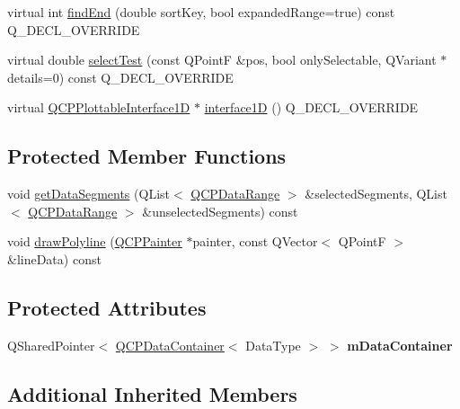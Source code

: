 \begin{DoxyCompactItemize}
\item 
virtual int \hyperlink{classQCPAbstractPlottable1D_a6e3ba20c9160d7361e58070390d10b1a}{find\+End} (double sort\+Key, bool expanded\+Range=true) const Q\+\_\+\+D\+E\+C\+L\+\_\+\+O\+V\+E\+R\+R\+I\+DE
\item 
virtual double \hyperlink{classQCPAbstractPlottable1D_a4611b43bcb6441b2154eb4f4e0a33db2}{select\+Test} (const Q\+PointF \&pos, bool only\+Selectable, Q\+Variant $\ast$details=0) const Q\+\_\+\+D\+E\+C\+L\+\_\+\+O\+V\+E\+R\+R\+I\+DE
\item 
virtual \hyperlink{classQCPPlottableInterface1D}{Q\+C\+P\+Plottable\+Interface1D} $\ast$ \hyperlink{classQCPAbstractPlottable1D_ac58fb47bfe330f6931ed8e64326387d7}{interface1D} () Q\+\_\+\+D\+E\+C\+L\+\_\+\+O\+V\+E\+R\+R\+I\+DE
\end{DoxyCompactItemize}
\subsection*{Protected Member Functions}
\begin{DoxyCompactItemize}
\item 
void \hyperlink{classQCPAbstractPlottable1D_ae890e62ce403c54f575c73b9529f1af8}{get\+Data\+Segments} (Q\+List$<$ \hyperlink{classQCPDataRange}{Q\+C\+P\+Data\+Range} $>$ \&selected\+Segments, Q\+List$<$ \hyperlink{classQCPDataRange}{Q\+C\+P\+Data\+Range} $>$ \&unselected\+Segments) const
\item 
void \hyperlink{classQCPAbstractPlottable1D_a7adc6c3cccebb5341f11e0c2b7d54206}{draw\+Polyline} (\hyperlink{classQCPPainter}{Q\+C\+P\+Painter} $\ast$painter, const Q\+Vector$<$ Q\+PointF $>$ \&line\+Data) const
\end{DoxyCompactItemize}
\subsection*{Protected Attributes}
\begin{DoxyCompactItemize}
\item 
\mbox{\label{classQCPAbstractPlottable1D_ac139cf70590707a1fb40eabe97fac246}} 
Q\+Shared\+Pointer$<$ \hyperlink{classQCPDataContainer}{Q\+C\+P\+Data\+Container}$<$ Data\+Type $>$ $>$ {\bfseries m\+Data\+Container}
\end{DoxyCompactItemize}
\subsection*{Additional Inherited Members}


